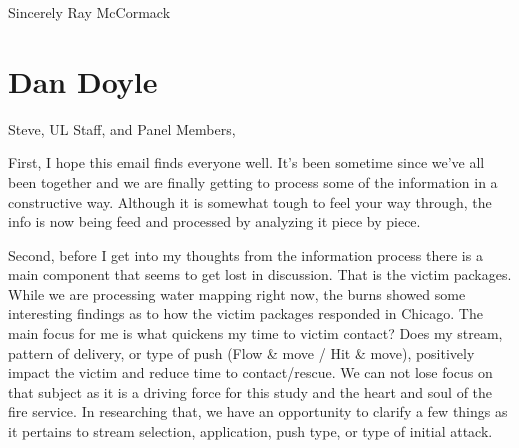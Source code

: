 \documentclass[12pt,oneside]{book}
\begin{document}
\begin{appendix}
Sincerely
Ray McCormack




\section{Dan Doyle}

Steve, UL Staff, and Panel Members,
 
 
First, I hope this email finds everyone well.  It's been sometime since we've all been together and we are finally getting to process some of the information in a constructive way.  Although it is somewhat tough to feel your way through, the info is now being feed and processed by analyzing it piece by piece.  
 
Second, before I get into my thoughts from the information process there is a main component that seems to get lost in discussion.  That is the victim packages.  While we are processing water mapping right now, the burns showed some interesting findings as to how the victim packages responded in Chicago.  The main focus for me is what quickens my time to victim contact? Does my stream, pattern of delivery, or type of push (Flow \& move / Hit \& move), positively impact the victim and reduce time to contact/rescue.  We can not lose focus on that subject as it is a driving force for this study and the heart and soul of the fire service.  In researching that, we have an opportunity to clarify a few things as it pertains to stream selection, application, push type, or type of initial attack.
 

\end{appendix}
\end{document}
